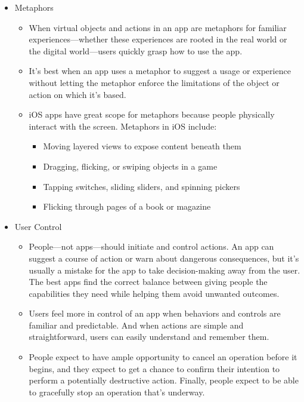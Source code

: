 \begin{itemize}
\begin{itemize}
	\end{itemize}
\item Metaphors
	\begin{itemize}
	\item  When virtual objects and actions in an app are metaphors for familiar experiences—whether these experiences are rooted in the real world or the digital world—users quickly grasp how to use the app.
	\item It’s best when an app uses a metaphor to suggest a usage or experience without letting the metaphor enforce the limitations of the object or action on which it’s based.
	\item iOS apps have great scope for metaphors because people physically interact with the screen. Metaphors in iOS include: 
		\begin{itemize}
		\item Moving layered views to expose content beneath them
		\item Dragging, flicking, or swiping objects in a game
		\item Tapping switches, sliding sliders, and spinning pickers
		\item Flicking through pages of a book or magazine
		\end{itemize}
	\end{itemize}
\item User Control
	\begin{itemize}
	\item People—not apps—should initiate and control actions. An app can suggest a course of action or warn about dangerous consequences, but it’s usually a mistake for the app to take decision-making away from the user. The best apps find the correct balance between giving people the capabilities they need while helping them avoid unwanted outcomes.
	\item Users feel more in control of an app when behaviors and controls are familiar and predictable. And when actions are simple and straightforward, users can easily understand and remember them. 
	\item People expect to have ample opportunity to cancel an operation before it begins, and they expect to get a chance to confirm their intention to perform a potentially destructive action. Finally, people expect to be able to gracefully stop an operation that’s underway. 
	\end{itemize}
\end{itemize}
